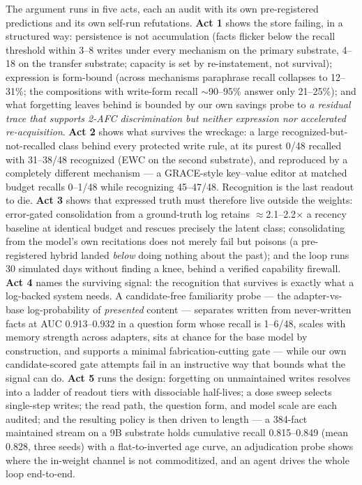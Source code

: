 \documentclass[11pt]{article}
\begin{document}
The argument runs in five acts, each an audit with its own pre-registered predictions and its own
self-run refutations. \textbf{Act 1} shows the store failing, in a structured way: persistence is
not accumulation (facts flicker below the recall threshold within 3--8 writes under every
mechanism on the primary substrate, 4--18 on the transfer substrate; capacity is set by
re-instatement, not survival); expression is form-bound (across mechanisms paraphrase
recall collapses to 12--31\%; the compositions with write-form recall $\sim$90--95\% answer only
21--25\%); and what forgetting leaves
behind is bounded by our own savings probe to \emph{a residual trace that supports 2-AFC
discrimination but neither expression nor accelerated re-acquisition}. \textbf{Act 2} shows what
survives the wreckage: a large recognized-but-not-recalled class behind every protected write
rule, at its purest 0/48 recalled with 31--38/48 recognized (EWC on the second substrate), and
reproduced by a completely different mechanism --- a GRACE-style key--value editor at matched
budget recalls 0--1/48 while recognizing 45--47/48. Recognition is the last readout to die.
\textbf{Act 3} shows that expressed truth must therefore live outside the weights: error-gated
consolidation from a ground-truth log retains $\approx$2.1--2.2$\times$ a recency baseline at identical budget
and rescues precisely the latent class; consolidating from the model's own recitations does not
merely fail but poisons (a pre-registered hybrid landed \emph{below} doing nothing about the
past); and the loop runs 30 simulated days without finding a knee, behind a verified capability
firewall. \textbf{Act 4} names the surviving signal: the recognition that survives is exactly
what a log-backed system needs. A candidate-free familiarity probe --- the adapter-vs-base
log-probability of \emph{presented} content --- separates written from never-written facts at AUC
0.913--0.932 in a question form whose recall is 1--6/48, scales with memory strength across
adapters, sits at chance for the base model by construction, and supports a minimal
fabrication-cutting gate --- while our own candidate-scored gate attempts fail in an instructive
way that bounds what the signal can do. \textbf{Act 5} runs the design: forgetting on
unmaintained writes resolves into a ladder of readout tiers with dissociable half-lives; a dose
sweep selects single-step writes; the read path, the question form, and model scale are each
audited; and the resulting policy is then driven to length --- a 384-fact maintained stream on a
9B substrate holds cumulative recall 0.815--0.849 (mean 0.828, three seeds) with a flat-to-inverted age curve, an
adjudication probe shows where the in-weight channel is not commoditized, and an agent drives
the whole loop end-to-end.
\end{document}
